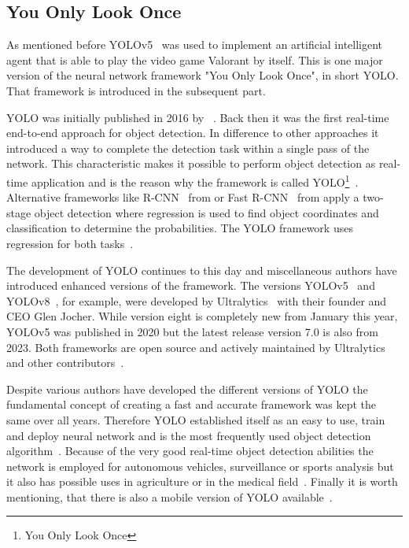 \subsection[Neural Network Framework: You Only Look Once]{You Only Look 
Once}\label{subsec:intro:yolo}

As mentioned before YOLOv5~\cite{jocher2020} was used to implement an artificial intelligent agent 
that is able to play the video game Valorant by itself. This is one major version of the neural network 
framework "You Only Look Once", in short YOLO. That framework is introduced in the subsequent 
part.

YOLO was initially published in 2016 by \citeauthor{redmon2016}~\cite{redmon2016}. Back then it 
was the first real-time end-to-end approach for object detection. In difference to other approaches it 
introduced a way to complete the detection task within a single pass of the network. This 
characteristic makes it possible to perform object detection as real-time application and is the 
reason why the framework is called YOLO\footnote{You Only Look Once}~\cite{terven2023}. 
Alternative frameworks like R-CNN~\cite{girshick1994} from \citeyear{girshick1994} or Fast 
R-CNN~\cite{girshick2015} from \citeyear{girshick2015} apply a two-stage object detection where 
regression is used to find object coordinates and classification to determine the probabilities. The 
YOLO framework uses regression for both tasks~\cite{aydin2023, terven2023}.

The development of YOLO continues to this day and miscellaneous authors have introduced 
enhanced versions of the framework. The versions YOLOv5~\cite{jocher2020} and 
YOLOv8~\cite{jocher2023}, for example, were developed by Ultralytics~\cite{ultralytics} with their 
founder and CEO Glen Jocher. While version eight is completely new from January this year,  
YOLOv5 was published in 2020 but the latest release version 7.0 is also from 2023. Both 
frameworks are open source and actively maintained by Ultralytics and other 
contributors~\cite{terven2023}.

Despite various authors have developed the different versions of YOLO the fundamental concept of 
creating a fast and accurate framework was kept the same over all years. Therefore YOLO 
established itself as an easy to use, train and deploy neural network and is the most frequently used 
object detection algorithm~\cite{aydin2023, terven2023}. Because of the very good real-time object 
detection abilities the network is employed for autonomous vehicles, surveillance or sports 
analysis but it also has possible uses in agriculture or in the medical field~\cite{terven2023, 
zheng2022}. Finally it is worth mentioning, that there is also a mobile version of YOLO 
available~\cite{terven2023}.

